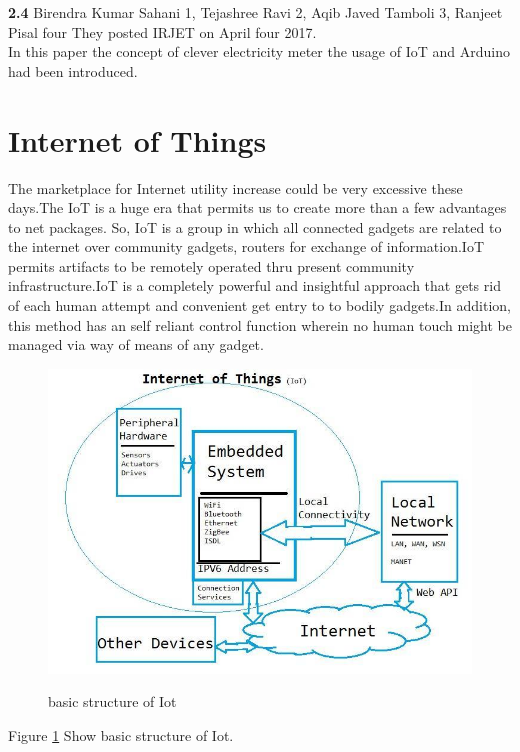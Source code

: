 \documentclass[12pt,a4paper]{article}
\begin{document}
\hspace{0.2cm} \textbf{2.4} Birendra Kumar Sahani 1, Tejashree Ravi 2, Aqib Javed Tamboli 3, Ranjeet Pisal four
They posted IRJET on April four 2017.\\

In this paper the concept of clever electricity meter the usage of IoT and Arduino had been introduced.\\



\newpage
\pagebreak
\vspace*{\fill}%
\noindent
{}
\vfill

\newpage
\section{Internet of Things}
\fancyfoot[R]{\thepage}

\hspace{0.5cm}The marketplace for Internet utility increase could be very excessive these days.The IoT is a huge era that
permits us to create more than a few advantages to net packages. So, IoT is a group in which
all connected gadgets are related to the internet over community gadgets, routers for exchange of
information.IoT permits artifacts to be remotely operated thru present community infrastructure.IoT
is a completely powerful and insightful approach that gets rid of each human attempt and convenient
get entry to to bodily gadgets.In addition, this method has an self reliant control function
wherein no human touch might be managed via way of means of any gadget.

\begin{figure}[H]
	\centering
	\includegraphics[width=\linewidth]{iot-structure.png}\\
	\caption{basic structure of Iot}
	\label{fig:3.1}
\end{figure}
\begin{center}
Figure \ref{fig:3.1} Show basic structure of Iot.
\end{center}
\end{document}
